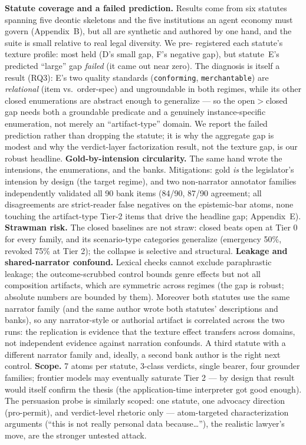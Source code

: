 \textbf{Statute coverage and a failed prediction.} Results come from six
statutes spanning five deontic skeletons and the five institutions an agent
economy must govern (Appendix~B), but all are synthetic and authored by one
hand, and the suite is small relative to real legal diversity. We pre-%
registered each statute's texture profile: most held (D's small gap, F's
negative gap), but statute~E's predicted ``large'' gap \emph{failed} (it came
out near zero). The diagnosis is itself a result (RQ3): E's two quality
standards (\texttt{conforming}, \texttt{merchantable}) are \emph{relational}
(item vs.\ order-spec) and ungroundable in both regimes, while its other
closed enumerations are abstract enough to generalize --- so the open$>$closed
gap needs both a groundable predicate and a genuinely instance-specific
enumeration, not merely an ``artifact-type'' domain. We report the failed
prediction rather than dropping the statute; it is why the aggregate gap is
modest and why the verdict-layer factorization result, not the texture gap, is
our robust headline.
\textbf{Gold-by-intension circularity.} The same hand wrote the intensions,
the enumerations, and the banks. Mitigations: gold \emph{is} the
legislator's intension by design (the target regime), and two non-narrator
annotator families independently validated all 90 bank items (84/90, 87/90
agreement; all disagreements are strict-reader false negatives on the
epistemic-bar atoms, none touching the artifact-type Tier-2 items that drive
the headline gap; Appendix~E).
\textbf{Strawman risk.} The closed baselines are not straw: closed beats
open at Tier 0 for every family, and its scenario-type categories generalize
(emergency 50\%, revoked 75\% at Tier 2); the collapse is selective and
structural.
\textbf{Leakage and shared-narrator confound.} Lexical checks cannot exclude
paraphrastic leakage; the outcome-scrubbed control bounds genre effects but
not all composition artifacts, which are symmetric across regimes (the gap
is robust; absolute numbers are bounded by them). Moreover both statutes use
the same narrator family (and the same author wrote both statutes'
descriptions and banks), so any narrator-style or authorial artifact is
correlated across the two runs: the replication is evidence that the texture
effect transfers across domains, not independent evidence against narration
confounds. A third statute with a different narrator family and, ideally, a
second bank author is the right next control.
\textbf{Scope.} 7 atoms per statute, 3-class verdicts, single bearer, four
grounder families; frontier models may eventually saturate Tier 2 --- by
design that result would itself confirm the thesis (the application-time
interpreter got good enough). The persuasion probe is similarly scoped: one
statute, one advocacy direction (pro-permit), and verdict-level rhetoric
only --- atom-targeted characterization arguments (``this is not really
personal data because\dots''), the realistic lawyer's move, are the
stronger untested attack.

